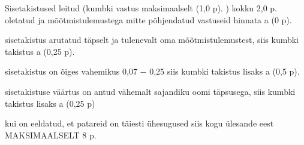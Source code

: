 Sisetakistused leitud (kumbki vastus maksimaalselt (1,0 p). ) kokku 2,0 p. oletatud ja mõõtmistulemustega mitte põhjendatud vastuseid hinnata a (0 p).

sisetakistus arutatud täpselt ja tulenevalt oma mõõtmistulemustest, siis kumbki takistus a (0,25 p).

sisetakistus on õiges vahemikus 0,07 $-$ 0,25 siis kumbki takistus lisaks a (0,5 p).

sisetakistuse väärtus on antud vähemalt sajandiku oomi täpsusega, siis kumbki takistus lisaks a (0,25 p)

kui on eeldatud, et patareid on täiesti ühesugused siis kogu ülesande eest MAKSIMAALSELT 8 p.
\probend
